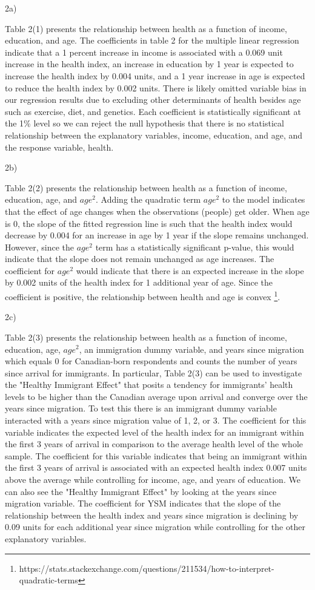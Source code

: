 \documentclass[11pt]{article}
\begin{document}
2a)

Table 2(1) presents the relationship between health as a function of income, education, and age. The coefficients in table 2 for the multiple linear regression indicate that a 1 percent increase in income is associated with a 0.069 unit increase in the health index, an increase in education by 1 year is expected to increase the health index by 0.004 units, and a 1 year increase in age is expected to reduce the health index by 0.002 units. There is likely omitted variable bias in our regression results due to excluding other determinants of health besides age such as exercise, diet, and genetics. Each coefficient is statistically significant at the 1\% level so we can reject the null hypothesis that there is no statistical relationship between the explanatory variables, income, education, and age, and the response variable, health.

2b)

Table 2(2) presents the relationship between health as a function of income, education, age, and $age^{2}$. Adding the quadratic term $age^{2}$ to the model indicates that the effect of age changes when the observations (people) get older. When age is 0, the slope of the fitted regression line is such that the health index would decrease by 0.004 for an increase in age by 1 year if the slope remains unchanged. However, since the $age^{2}$ term has a statistically significant p-value, this would indicate that the slope does not remain unchanged as age increases. The coefficient for $age^{2}$ would indicate that there is an expected increase in the slope by 0.002 units of the health index for 1 additional year of age. Since the coefficient is positive, the relationship between health and age is convex \footnote[1]{https://stats.stackexchange.com/questions/211534/how-to-interpret-quadratic-terms}.

2c)

Table 2(3) presents the relationship between health as a function of income, education, age, $age^{2}$, an immigration dummy variable, and years since migration which equals 0 for Canadian-born respondents and counts the number of years since arrival for immigrants. In particular, Table 2(3) can be used to investigate the "Healthy Immigrant Effect" that posits a tendency for immigrants' health levels to be higher than the Canadian average upon arrival and converge over the years since migration. To test this there is an immigrant dummy variable interacted with a years since migration value of 1, 2, or 3. The coefficient for this variable indicates the expected level of the health index for an immigrant within the first 3 years of arrival in comparison to the average health level of the whole sample. The coefficient for this variable indicates that being an immigrant within the first 3 years of arrival is associated with an expected health index 0.007 units above the average while controlling for income, age, and years of education. We can also see the "Healthy Immigrant Effect" by looking at the years since migration variable. The coefficient for YSM indicates that the slope of the relationship between the health index and years since migration is declining by 0.09 units for each additional year since migration while controlling for the other explanatory variables.
\end{document}
